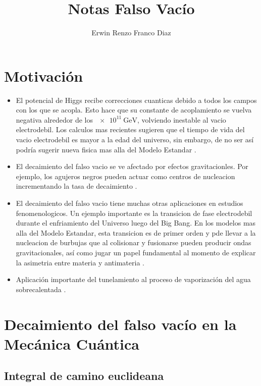 \documentclass[11pt, a4paper]{article}
\title{Notas Falso Vacío}
\author{Erwin Renzo Franco Diaz}
\date{}
\numberwithin{equation}{section}
\theoremstyle{definition}
\begin{document}
\maketitle

\section{Motivación}

\begin{itemize}

\item El potencial de Higgs recibe correcciones cuanticas debido a todos los campos con los que se acopla. Esto hace que su constante de acoplamiento se vuelva negativa alrededor de los $\SI{e11}{\giga\electronvolt}$, volviendo inestable al vacio electrodebil. Los calculos mas recientes sugieren que el tiempo de vida del vacio electrodebil es mayor a la edad del universo, sin embargo, de no ser así podría sugerir nueva fisica mas alla del Modelo Estandar \cite{Ai:2019dqr}.

\item El decaimiento del falso vacio se ve afectado por efectos gravitacionles. Por ejemplo, los agujeros negros pueden actuar como centros de nucleacion incrementando la tasa de decaimiento \cite{Ai:2019dqr}.

\item El decaimiento del falso vacio tiene muchas otras aplicaciones en estudios fenomenologicos. Un ejemplo importante es la transicion de fase electrodebil durante el enfriamiento del Universo luego del Big Bang. En los modelos mas alla del Modelo Estandar, esta transicion es de primer orden y pde llevar a la nucleacion de burbujas que al colisionar y fusionarse pueden producir ondas gravitacionales, así como jugar un papel fundamental al momento de explicar la asimetria entre materia y antimateria \cite{Ai:2019dqr}. 

\item Aplicación importante del tunelamiento al proceso de vaporización del agua sobrecalentada  \cite{kleinert2009path}. 

\end{itemize}

\section{Decaimiento del falso vacío en la Mecánica Cuántica}

\subsection{Integral de camino euclideana}
\end{document}
